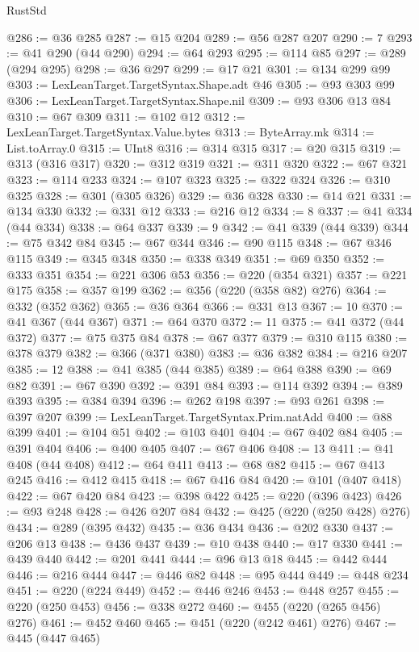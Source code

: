 \begin{lexlean}{RustStd}
\begin{coremodule}
{\begin{coremodule}
{{{{{{{{{{{{{{{{{{{{{{{{{{@286 := @36 @285
@287 := @15 @204
@289 := @56 @287 @207
@290 := 7
@293 := @41 @290 (@44 @290)
@294 := @64 @293
@295 := @114 @85
@297 := @289 (@294 @295)
@298 := @36 @297
@299 := @17 @21
@301 := @134 @299 @99
@303 := LexLeanTarget.TargetSyntax.Shape.adt @46
@305 := @93 @303 @99
@306 := LexLeanTarget.TargetSyntax.Shape.nil
@309 := @93 @306 @13 @84
@310 := @67 @309
@311 := @102 @12
@312 := LexLeanTarget.TargetSyntax.Value.bytes
@313 := ByteArray.mk
@314 := List.toArray.{0}
@315 := UInt8
@316 := @314 @315
@317 := @20 @315
@319 := @313 (@316 @317)
@320 := @312 @319
@321 := @311 @320
@322 := @67 @321
@323 := @114 @233
@324 := @107 @323
@325 := @322 @324
@326 := @310 @325
@328 := @301 (@305 @326)
@329 := @36 @328
@330 := @14 @21
@331 := @134 @330
@332 := @331 @12
@333 := @216 @12
@334 := 8
@337 := @41 @334 (@44 @334)
@338 := @64 @337
@339 := 9
@342 := @41 @339 (@44 @339)
@344 := @75 @342 @84
@345 := @67 @344
@346 := @90 @115
@348 := @67 @346 @115
@349 := @345 @348
@350 := @338 @349
@351 := @69 @350
@352 := @333 @351
@354 := @221 @306 @53
@356 := @220 (@354 @321)
@357 := @221 @175
@358 := @357 @199
@362 := @356 (@220 (@358 @82) @276)
@364 := @332 (@352 @362)
@365 := @36 @364
@366 := @331 @13
@367 := 10
@370 := @41 @367 (@44 @367)
@371 := @64 @370
@372 := 11
@375 := @41 @372 (@44 @372)
@377 := @75 @375 @84
@378 := @67 @377
@379 := @310 @115
@380 := @378 @379
@382 := @366 (@371 @380)
@383 := @36 @382
@384 := @216 @207
@385 := 12
@388 := @41 @385 (@44 @385)
@389 := @64 @388
@390 := @69 @82
@391 := @67 @390
@392 := @391 @84
@393 := @114 @392
@394 := @389 @393
@395 := @384 @394
@396 := @262 @198
@397 := @93 @261
@398 := @397 @207
@399 := LexLeanTarget.TargetSyntax.Prim.natAdd
@400 := @88 @399
@401 := @104 @51
@402 := @103 @401
@404 := @67 @402 @84
@405 := @391 @404
@406 := @400 @405
@407 := @67 @406
@408 := 13
@411 := @41 @408 (@44 @408)
@412 := @64 @411
@413 := @68 @82
@415 := @67 @413 @245
@416 := @412 @415
@418 := @67 @416 @84
@420 := @101 (@407 @418)
@422 := @67 @420 @84
@423 := @398 @422
@425 := @220 (@396 @423)
@426 := @93 @248
@428 := @426 @207 @84
@432 := @425 (@220 (@250 @428) @276)
@434 := @289 (@395 @432)
@435 := @36 @434
@436 := @202 @330
@437 := @206 @13
@438 := @436 @437
@439 := @10 @438
@440 := @17 @330
@441 := @439 @440
@442 := @201 @441
@444 := @96 @13 @18
@445 := @442 @444
@446 := @216 @444
@447 := @446 @82
@448 := @95 @444
@449 := @448 @234
@451 := @220 (@224 @449)
@452 := @446 @246
@453 := @448 @257
@455 := @220 (@250 @453)
@456 := @338 @272
@460 := @455 (@220 (@265 @456) @276)
@461 := @452 @460
@465 := @451 (@220 (@242 @461) @276)
@467 := @445 (@447 @465)
}}}}}}}}}}}}}}}}}}}}}}}}}}
\end{coremodule}}
\end{coremodule}
\end{lexlean}
